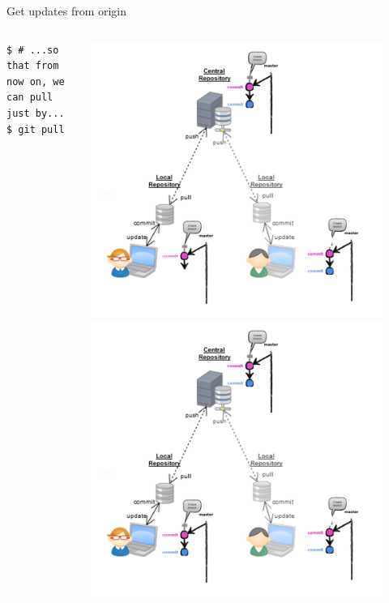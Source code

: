 \begin{frame}[fragile]{Get updates from origin}
\begin{columns}
\begin{column}{0.6\textwidth}
\begin{lstlisting}
$ # ...so that from now on, we can pull just by...
$ git pull
	\end{lstlisting}
	\end{column}
	\begin{column}{0.4\textwidth}
		\begin{center}
			 {
				\includegraphics[width=0.9\textwidth]{multiuser_they_push.png}
			}\only<3-> {
				\includegraphics[width=0.9\textwidth]{multiuser_pull.png}
			}
		\end{center}
	\end{column}
\end{columns}
\end{frame}



